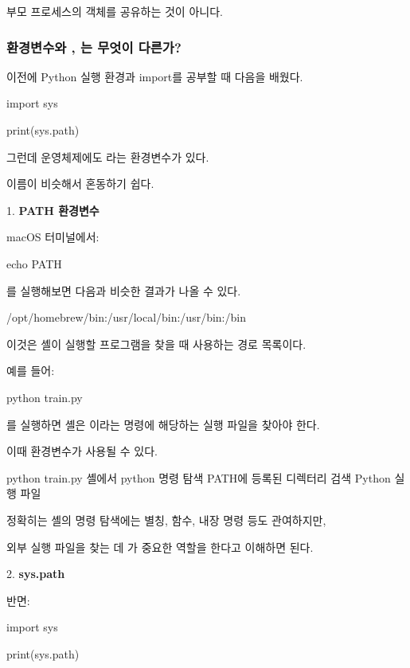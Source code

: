 부모 프로세스의  객체를 공유하는 것이 아니다.

\subsubsection{환경변수와 , 는 무엇이 다른가?}

이전에 Python 실행 환경과 import를 공부할 때 다음을 배웠다.

\begin{dhkcode}
import sys

print(sys.path)
\end{dhkcode}

그런데 운영체제에도 라는 환경변수가 있다.

이름이 비슷해서 혼동하기 쉽다.


1. \textbf{PATH 환경변수}

macOS 터미널에서:

\begin{dhkzsh}
echo PATH
\end{dhkzsh}

를 실행해보면 다음과 비슷한 결과가 나올 수 있다.

\begin{dhkzsh}
/opt/homebrew/bin:/usr/local/bin:/usr/bin:/bin
\end{dhkzsh}

이것은 셸이 실행할 프로그램을 찾을 때 사용하는 경로 목록이다.

예를 들어:

\begin{dhkzsh}
python train.py
\end{dhkzsh}

를 실행하면 셸은 이라는 명령에 해당하는 실행 파일을 찾아야 한다.

이때  환경변수가 사용될 수 있다.

\begin{dhksmry}[centered]
python train.py
\da
셸에서 python 명령 탐색
\da
PATH에 등록된 디렉터리 검색
\da
Python 실행 파일
\end{dhksmry}

정확히는 셸의 명령 탐색에는 별칭, 함수, 내장 명령 등도 관여하지만,

외부 실행 파일을 찾는 데 가 중요한 역할을 한다고 이해하면 된다.


2. \textbf{sys.path}

반면:

\begin{dhkcode}
import sys

print(sys.path)
\end{dhkcode}

